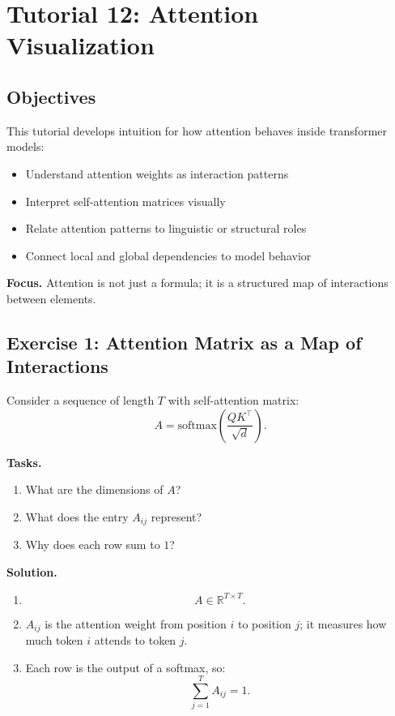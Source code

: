 \section{Tutorial 12: Attention Visualization}

\subsection{Objectives}

This tutorial develops intuition for how attention behaves inside transformer models:

\begin{itemize}
    \item Understand attention weights as interaction patterns
    \item Interpret self-attention matrices visually
    \item Relate attention patterns to linguistic or structural roles
    \item Connect local and global dependencies to model behavior
\end{itemize}

\medskip

\noindent
\textbf{Focus.}  
Attention is not just a formula; it is a structured map of interactions between elements.

\subsection{Exercise 1: Attention Matrix as a Map of Interactions}

Consider a sequence of length $T$ with self-attention matrix:
\[
A = \text{softmax}\left(\frac{QK^\top}{\sqrt{d}}\right).
\]

\medskip

\noindent
\textbf{Tasks.}
\begin{enumerate}
    \item What are the dimensions of $A$?
    \item What does the entry $A_{ij}$ represent?
    \item Why does each row sum to $1$?
\end{enumerate}

\medskip

\noindent
\textbf{Solution.}

\begin{enumerate}
    \item
    \[
    A \in \mathbb{R}^{T \times T}.
    \]

    \item $A_{ij}$ is the attention weight from position $i$ to position $j$; it measures how much token $i$ attends to token $j$.

    \item Each row is the output of a softmax, so:
    \[
    \sum_{j=1}^T A_{ij} = 1.
    \]
\end{enumerate}

